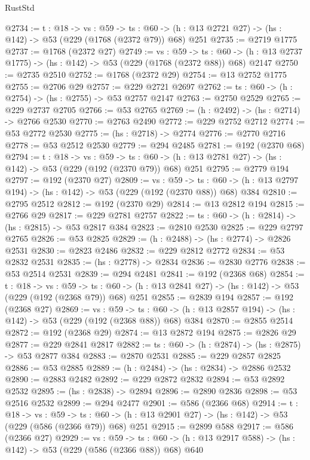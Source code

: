 \begin{lexlean}{RustStd}
\begin{coremodule}
@2734 := {t : @18} ->
  {vs : @59} ->
  {ts : @60} -> (h : @13 @2721 @27) -> (hs : @142) -> @53 (@229 (@1768 (@2372 @79)) @68) @251
@2735 := @2719 @1775
@2737 := @1768 (@2372 @27)
@2749 := {vs : @59} ->
  {ts : @60} -> (h : @13 @2737 @1775) -> (hs : @142) -> @53 (@229 (@1768 (@2372 @88)) @68) @2147
@2750 := @2735 @2510
@2752 := @1768 (@2372 @29)
@2754 := @13 @2752 @1775
@2755 := @2706 @29
@2757 := @229 @2721 @2697
@2762 := {ts : @60} -> (h : @2754) -> (hs : @2755) -> @53 @2757 @2147
@2763 := @2750 @2529
@2765 := @229 @2737 @2705
@2766 := @53 @2765
@2769 := (h : @2492) -> (hs : @2714) -> @2766 @2530
@2770 := @2763 @2490
@2772 := @229 @2752 @2712
@2774 := @53 @2772 @2530
@2775 := (hs : @2718) -> @2774
@2776 := @2770 @2716
@2778 := @53 @2512 @2530
@2779 := @294 @2485
@2781 := @192 (@2370 @68)
@2794 := {t : @18} ->
  {vs : @59} ->
  {ts : @60} -> (h : @13 @2781 @27) -> (hs : @142) -> @53 (@229 (@192 (@2370 @79)) @68) @251
@2795 := @2779 @194
@2797 := @192 (@2370 @27)
@2809 := {vs : @59} ->
  {ts : @60} -> (h : @13 @2797 @194) -> (hs : @142) -> @53 (@229 (@192 (@2370 @88)) @68) @384
@2810 := @2795 @2512
@2812 := @192 (@2370 @29)
@2814 := @13 @2812 @194
@2815 := @2766 @29
@2817 := @229 @2781 @2757
@2822 := {ts : @60} -> (h : @2814) -> (hs : @2815) -> @53 @2817 @384
@2823 := @2810 @2530
@2825 := @229 @2797 @2765
@2826 := @53 @2825
@2829 := (h : @2488) -> (hs : @2774) -> @2826 @2531
@2830 := @2823 @2486
@2832 := @229 @2812 @2772
@2834 := @53 @2832 @2531
@2835 := (hs : @2778) -> @2834
@2836 := @2830 @2776
@2838 := @53 @2514 @2531
@2839 := @294 @2481
@2841 := @192 (@2368 @68)
@2854 := {t : @18} ->
  {vs : @59} ->
  {ts : @60} -> (h : @13 @2841 @27) -> (hs : @142) -> @53 (@229 (@192 (@2368 @79)) @68) @251
@2855 := @2839 @194
@2857 := @192 (@2368 @27)
@2869 := {vs : @59} ->
  {ts : @60} -> (h : @13 @2857 @194) -> (hs : @142) -> @53 (@229 (@192 (@2368 @88)) @68) @384
@2870 := @2855 @2514
@2872 := @192 (@2368 @29)
@2874 := @13 @2872 @194
@2875 := @2826 @29
@2877 := @229 @2841 @2817
@2882 := {ts : @60} -> (h : @2874) -> (hs : @2875) -> @53 @2877 @384
@2883 := @2870 @2531
@2885 := @229 @2857 @2825
@2886 := @53 @2885
@2889 := (h : @2484) -> (hs : @2834) -> @2886 @2532
@2890 := @2883 @2482
@2892 := @229 @2872 @2832
@2894 := @53 @2892 @2532
@2895 := (hs : @2838) -> @2894
@2896 := @2890 @2836
@2898 := @53 @2516 @2532
@2899 := @294 @2477
@2901 := @586 (@2366 @68)
@2914 := {t : @18} ->
  {vs : @59} ->
  {ts : @60} -> (h : @13 @2901 @27) -> (hs : @142) -> @53 (@229 (@586 (@2366 @79)) @68) @251
@2915 := @2899 @588
@2917 := @586 (@2366 @27)
@2929 := {vs : @59} ->
  {ts : @60} -> (h : @13 @2917 @588) -> (hs : @142) -> @53 (@229 (@586 (@2366 @88)) @68) @640

\end{coremodule}
\end{lexlean}
